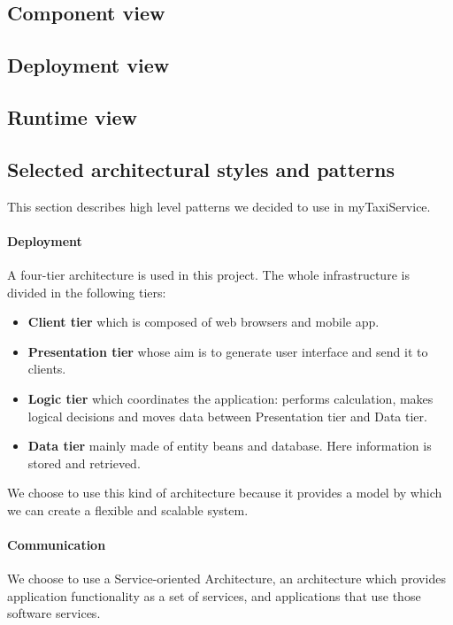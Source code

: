 \subsection{Component view}


\subsection{Deployment view}
\label{sec:deploy}

\subsection{Runtime view}
\subsection{Selected architectural styles and patterns}
This section describes high level patterns we decided to use in myTaxiService.

\paragraph{Deployment} A four-tier architecture is used in this project.
The whole infrastructure is divided in the following tiers:

\begin{itemize}
    \item{\textbf{Client tier} which is composed of web browsers and mobile app.}
    \item{\textbf{Presentation tier} whose aim is to generate user interface and send it to clients.}
    \item{\textbf{Logic tier} which coordinates the application: performs calculation, makes logical decisions and moves data between Presentation tier and Data tier.}
    \item{\textbf{Data tier} mainly made of entity beans and database. 
    Here information is stored and retrieved.}
\end{itemize}

We choose to use this kind of architecture because it provides a model by which
we can create a flexible and scalable system.

\paragraph{Communication} We choose to use a Service-oriented Architecture, 
an architecture which provides application functionality as a set of services, 
and applications that use those software services. 

